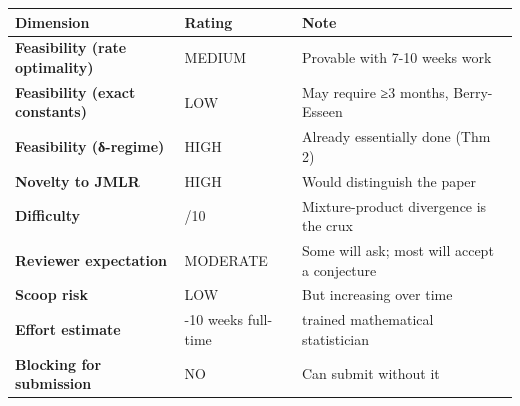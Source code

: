 \documentclass[
  12pt,
]{article}
\begin{document}
\begin{longtable}[]{@{}
  >{\raggedright\arraybackslash}p{}
  >{\raggedright\arraybackslash}p{}
  >{\raggedright\arraybackslash}p{}@{}}
\toprule\noalign{}
\begin{minipage}[b]{\linewidth}\raggedright
Dimension
\end{minipage} & \begin{minipage}[b]{\linewidth}\raggedright
Rating
\end{minipage} & \begin{minipage}[b]{\linewidth}\raggedright
Note
\end{minipage} \\
\midrule\noalign{}
\endhead
\bottomrule\noalign{}
\endlastfoot
\textbf{Feasibility (rate optimality)} & MEDIUM & Provable with 7-10
weeks work \\
\textbf{Feasibility (exact constants)} & LOW & May require ≥3 months,
Berry-Esseen \\
\textbf{Feasibility (δ-regime)} & HIGH & Already essentially done (Thm
2) \\
\textbf{Novelty to JMLR} & HIGH & Would distinguish the paper \\
\textbf{Difficulty} & 7/10 & Mixture-product divergence is the crux \\
\textbf{Reviewer expectation} & MODERATE & Some will ask; most will
accept a conjecture \\
\textbf{Scoop risk} & LOW & But increasing over time \\
\textbf{Effort estimate} & 7-10 weeks full-time & 1 trained mathematical
statistician \\
\textbf{Blocking for submission} & NO & Can submit without it \\
\end{longtable}
\end{document}
